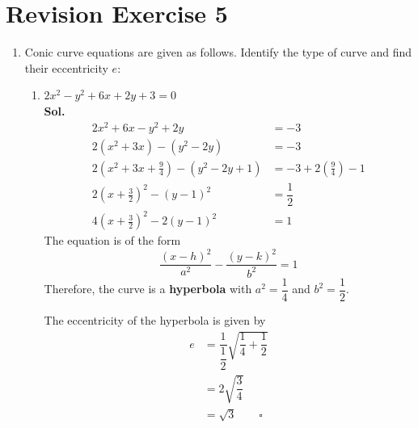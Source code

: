 \documentclass{report}
\newcommand{\sol}{\vspace{1em}\\\textbf{Sol.}}
\newcommand{\eos}{ \qquad \square}
\begin{document}
\section*{Revision Exercise 5}

\onehalfspacing
\begin{enumerate}
    \item Conic curve equations are given as follows. Identify the type of curve and find
          their eccentricity $e$:
          \begin{enumerate}
              \item $2x^2-y^2+6x+2y+3=0$
                    \sol{}
                    \begin{align*}
                        2x^2+6x-y^2+2y                                & = -3                                 \\
                        2(x^2+3x) - (y^2-2y)                          & = -3                                 \\
                        2\left(x^2+3x+\frac{9}{4}\right) - (y^2-2y+1) & = -3 + 2\left(\frac{9}{4}\right) - 1 \\
                        2\left(x+\frac{3}{2}\right)^2 - (y-1)^2       & = \dfrac{1}{2}                       \\
                        4\left(x+\frac{3}{2}\right)^2 - 2(y-1)^2      & = 1
                    \end{align*}
                    The equation is of the form
                    \begin{equation*}
                        \frac{(x-h)^2}{a^2} - \frac{(y-k)^2}{b^2} = 1
                    \end{equation*}
                    Therefore, the curve is a \textbf{hyperbola} with $a^2=\dfrac{1}{4}$ and $b^2=\dfrac{1}{2}$.

                    The eccentricity of the hyperbola is given by
                    \begin{align*}
                        e & = \dfrac{1}{\dfrac{1}{2}}\sqrt{\dfrac{1}{4} + \dfrac{1}{2}} \\
                          & = 2\sqrt{\dfrac{3}{4}}                                      \\
                          & = \sqrt{3} \eos
                    \end{align*}


\end{enumerate}
\end{enumerate}
\end{document}
